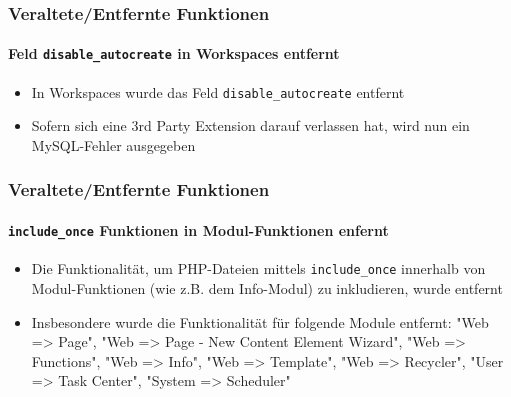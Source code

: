 \begin{frame}[fragile]
	\frametitle{Veraltete/Entfernte Funktionen}
	\framesubtitle{Feld \texttt{disable\_autocreate} in Workspaces entfernt}

	\begin{itemize}
		\item In Workspaces wurde das Feld \texttt{disable\_autocreate} entfernt

		\item Sofern sich eine 3rd Party Extension darauf verlassen hat, wird nun ein MySQL-Fehler ausgegeben
	\end{itemize}

\end{frame}


\begin{frame}[fragile]
	\frametitle{Veraltete/Entfernte Funktionen}
	\framesubtitle{\texttt{include\_once} Funktionen in Modul-Funktionen enfernt}

	\begin{itemize}

		\item Die Funktionalität, um PHP-Dateien mittels \texttt{include\_once} innerhalb von Modul-Funktionen (wie z.B. dem Info-Modul) zu inkludieren, wurde entfernt

		\item Insbesondere wurde die Funktionalität für folgende Module entfernt: "Web => Page", "Web => Page - New Content Element Wizard", "Web => Functions", "Web => Info", "Web => Template", "Web => Recycler", "User => Task Center", "System => Scheduler"

	\end{itemize}

\end{frame}


